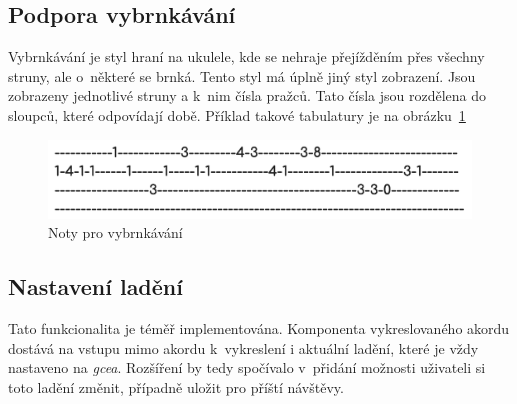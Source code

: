 \subsection*{Podpora vybrnkávání}
Vybrnkávání je styl hraní na ukulele, kde se nehraje přejížděním přes všechny struny, ale o~některé se brnká. Tento styl má úplně jiný styl zobrazení. Jsou zobrazeny jednotlivé struny a k~nim čísla pražců. Tato čísla jsou rozdělena do sloupců, které odpovídají době. Příklad takové tabulatury je na obrázku~\ref{fig:tablature}

\begin{figure}[h!]
    \centering
    \includegraphics[width=\textwidth]{assets/picking.png}
    \caption{Noty pro vybrnkávání}
    \label{fig:tablature}
\end{figure}

\subsection*{Nastavení ladění}
Tato funkcionalita je téměř implementována. Komponenta vykreslovaného akordu dostává na vstupu mimo akordu k~vykreslení i aktuální ladění, které je vždy nastaveno na \emph{gcea}. Rozšíření by tedy spočívalo v~přidání možnosti uživateli si toto ladění změnit, případně uložit pro příští návštěvy.

